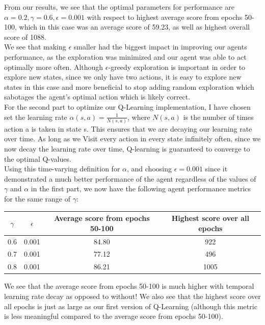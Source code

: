 \documentclass[submit]{harvardml}
\begin{document}
From our results, we see that the optimal parameters for performance are $\alpha = 0.2, \gamma = 0.6, \epsilon = 0.001$ with respect to highest average score from epochs 50-100, which in this case was an average score of 59.23, as well as highest overall score of 1088. \\
We see that making $\epsilon$ smaller had the biggest impact in improving our agents performance, as the exploration was minimized and our agent was able to act optimally more often. Although $\epsilon$-greedy exploration is important in order to explore new states, since we only have two actions, it is easy to explore new states in this case and more beneficial to stop adding random exploration which sabotages the agent's optimal action which is likely correct. \\

For the second part to optimize our Q-Learning implementation, I have chosen set the learning rate $\alpha(s,a) = \frac{1}{N(s, a)}$, where $N(s, a)$ is the number of times action a is taken in state s. This ensures that we are decaying our learning rate over time. As long as we Visit every action in every state infinitely often, since we now decay the learning rate over time, Q-learning is guaranteed to converge to the optimal Q-values. \\
Using this time-varying definition for $\alpha$, and choosing $\epsilon = 0.001$ since it demonstrated a much better performance of the agent regardless of the values of $\gamma$ and $\alpha$ in the first part, we now have the following agent performance metrics for the same range of $\gamma$:
\begin{center}
\begin{tabular}{||c c c c||} 
 \hline
 $\gamma$ & $\epsilon$ & Average score from epochs 50-100 & Highest score over all epochs \\ 
 \hline\hline
 0.6 & 0.001 & 84.80 & 922 \\
 \hline
 0.7 & 0.001 & 77.12 & 496 \\ 
 \hline
 0.8 & 0.001 & 86.21 & 1005 \\ 
 \hline
\end{tabular}
\end{center}
We see that the average score from epochs 50-100 is much higher with temporal learning rate decay as opposed to without! We also see that the highest score over all epochs is just as large as our first version of Q-Learning (although this metric is less meaningful compared to the average score from epochs 50-100).
\end{document}
